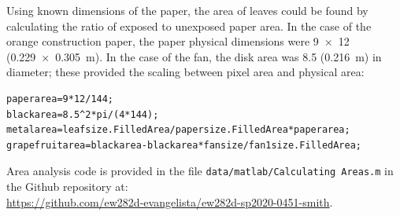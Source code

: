 Using known dimensions of the paper, the area of leaves could be found by calculating the ratio of exposed to unexposed paper area. In the case of the orange construction paper, the paper physical dimensions were \SI{9x12}{\inch} (\SI{0.229x0.305}{\meter}). In the case of the fan, the disk area was \SI{8.5}{\inch} (\SI{0.216}{\meter}) in diameter; these provided the scaling between pixel area and physical area:
\begin{lstlisting}
paperarea=9*12/144;
blackarea=8.5^2*pi/(4*144);
metalarea=leafsize.FilledArea/papersize.FilledArea*paperarea;
grapefruitarea=blackarea-blackarea*fansize/fan1size.FilledArea;
\end{lstlisting}

Area analysis code is provided in the file \lstinline{data/matlab/Calculating Areas.m} in the Github repository at:\\ \url{https://github.com/ew282d-evangelista/ew282d-sp2020-0451-smith}. 



